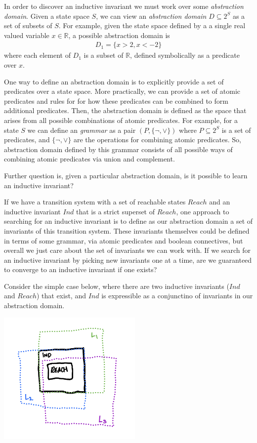 \documentclass[10pt]{article}
\begin{document}
In order to discover an inductive invariant we must work over some \textit{abstraction domain}. Given a state space $S$, we can view an \textit{abstraction domain} $D \subseteq 2^S$ as a set of subsets of $S$. For example, given the state space defined by a a single real valued variable $x \in \mathbb{R}$, a possible abstraction domain is
\begin{align*}
    D_1 = \{x > 2, x < - 2\}
\end{align*} 
where each element of $D_1$ is a subset of $\mathbb{R}$, defined symbolically as a predicate over $x$.

One way to define an abstraction domain is to explicitly provide a set of predicates over a state space. More practically, we can provide a set of atomic predicates and rules for for how these predicates can be combined to form additional predicates. Then, the abstraction domain is defined as the space that arises from all possible combinations of atomic predicates. For example, for a state $S$ we can define an \textit{grammar} as a pair $(P,\{\neg, \vee\})$ where $P \subseteq 2^S$ is a set of predicates, and $\{\neg, \vee\}$ are the operations for combining atomic predicates. So, abstraction domain defined by this grammar consists of all possible ways of combining atomic predicates via union and complement.

Further question is, given a particular abstraction domain, is it possible to learn an inductive invariant?

If we have a transition system with a set of reachable states $Reach$ and an inductive invariant $Ind$ that is a strict superset of $Reach$, one approach to searching for an inductive invariant is to define as our abstraction domain a set of invariants of this transition system. These invariants themselves could be defined in terms of some grammar, via atomic predicates and boolean connectives, but overall we just care about the set of invariants we can work with. If we search for an inductive invariant by picking new invariants one at a time, are we guaranteed to converge to an inductive invariant if one exists? 

Consider the simple case below, where there are two inductive invariants ($Ind$ and $Reach$) that exist, and $Ind$ is expressible as a conjunctino of invariants in our abstraction domain. 


\begin{center}
    \includegraphics[width=70mm]{invs1.png}  
\end{center}
\end{document}
